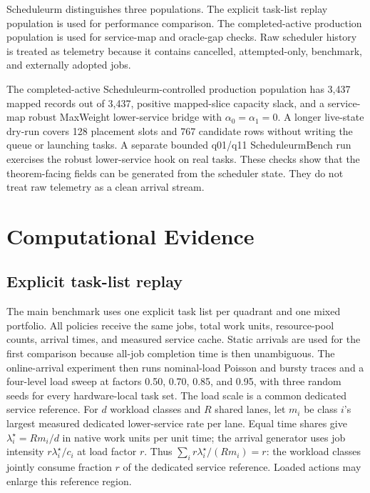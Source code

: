 \documentclass[opre,dblanonrev]{informs4}
\begin{document}
Scheduleurm distinguishes three populations.  The explicit task-list replay
population is used for performance comparison.  The completed-active production
population is used for service-map and oracle-gap checks.  Raw scheduler history
is treated as telemetry because it contains cancelled, attempted-only,
benchmark, and externally adopted jobs.

The completed-active Scheduleurm-controlled production population has 3,437
mapped records out of 3,437, positive mapped-slice capacity slack, and a
service-map robust MaxWeight lower-service bridge with
\(\alpha_0=\alpha_1=0\).  A longer live-state dry-run covers 128 placement
slots and 767 candidate rows without writing the queue or launching tasks.  A
separate bounded q01/q11 ScheduleurmBench run exercises the robust
lower-service hook on real tasks.  These checks show that the theorem-facing
fields can be generated from the scheduler state.  They do not treat raw
telemetry as a clean arrival stream.

\section{Computational Evidence}
\label{sec:experiments}

\subsection{Explicit task-list replay}
\label{subsec:task-list-replay}

The main benchmark uses one explicit task list per quadrant and one mixed
portfolio.  All policies receive the same jobs, total work units, resource-pool
counts, arrival times, and measured service cache.  Static arrivals are used for
the first comparison because all-job completion time is then unambiguous.  The
online-arrival experiment then runs nominal-load Poisson and bursty traces and
a four-level load sweep at factors 0.50, 0.70, 0.85, and 0.95, with three random
seeds for every hardware-local task set.  The load scale is a common dedicated
service reference.  For \(d\) workload classes and \(R\) shared lanes, let
\(m_i\) be class \(i\)'s largest measured dedicated lower-service rate per
lane.  Equal time shares give \(\lambda_i^\star=Rm_i/d\) in native work units
per unit time; the arrival generator uses job intensity
\(r\lambda_i^\star/c_i\) at load factor \(r\).  Thus
\(\sum_i r\lambda_i^\star/(Rm_i)=r\): the workload classes jointly consume
fraction \(r\) of the dedicated service reference.  Loaded actions may enlarge
this reference region.
\end{document}
